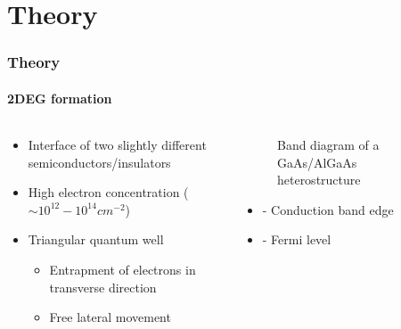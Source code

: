 \documentclass[mathserif,16pt,xcolor=table]{beamer}
\begin{document}
\section{Theory}
\begin{frame}
  \frametitle{Theory}
  \framesubtitle{2DEG formation}
  \begin{columns} %
    \begin{column}{.5\textwidth}
      \begin{minipage}[T][.1\textheight][c]{\linewidth}
        \begin{itemize}
          \item Interface of two slightly different semiconductors/insulators
          \item High electron concentration ($\sim 10^{12}-10^{14} cm^{-2}$)
          \item Triangular quantum well
          \begin{itemize}
            \item[]{Entrapment of electrons in transverse direction}
            \item[]{Free lateral movement}
          \end{itemize}
        \end{itemize}
      \end{minipage}
    \end{column}
    \begin{column}{.5\textwidth}
      \begin{figure}
        \vspace*{-1cm}
        \def\svgwidth{\linewidth}
        
        \caption{Band diagram of a GaAs/AlGaAs heterostructure}
      \end{figure}
      \begin{itemize}
        \item[]{ - Conduction band edge}
        \item[]{ - Fermi level}
      \end{itemize}
      \end{column}%
    \end{columns}
  \end{frame}
\end{document}

